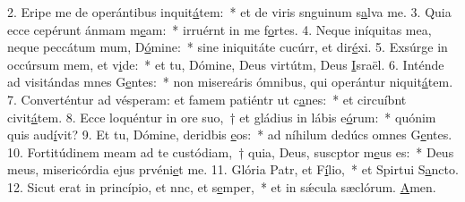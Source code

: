 2. Eripe me de operántibus inquit\uline{á}tem:~* et de viris snguinum s\uline{a}lva me.
3. Quia ecce cepérunt ánmam m\uline{e}am:~* irruérnt in me f\uline{o}rtes.
4. Neque iníquitas mea, neque peccátum mum, D\uline{ó}mine:~* sine iniquitáte cucúrr, et dir\uline{é}xi.
5. Exsúrge in occúrsum mem, et v\uline{i}de:~* et tu, Dómine, Deus virtútm, Deus \uline{I}sraël.
6. Inténde ad visitándas mnes G\uline{e}ntes:~* non misereáris ómnibus, qui operántur niquit\uline{á}tem.
7. Converténtur ad vésperam: et famem patiéntr ut c\uline{a}nes:~* et circuíbnt civit\uline{á}tem.
8. Ecce loquéntur in ore suo,~† et gládius in lábis e\uline{ó}rum:~* quónim quis aud\uline{í}vit?
9. Et tu, Dómine, deridbis \uline{e}os:~* ad níhilum dedúcs omnes G\uline{e}ntes.
10. Fortitúdinem meam ad te custódiam,~† quia, Deus, suscptor m\uline{e}us es:~* Deus meus, misericórdia ejus prvéni\uline{e}t me.
11. Glória Patr, et F\uline{í}lio,~* et Spirtui S\uline{a}ncto.
12. Sicut erat in princípio, et nnc, et s\uline{e}mper,~* et in sǽcula sæclórum. \uline{A}men.
